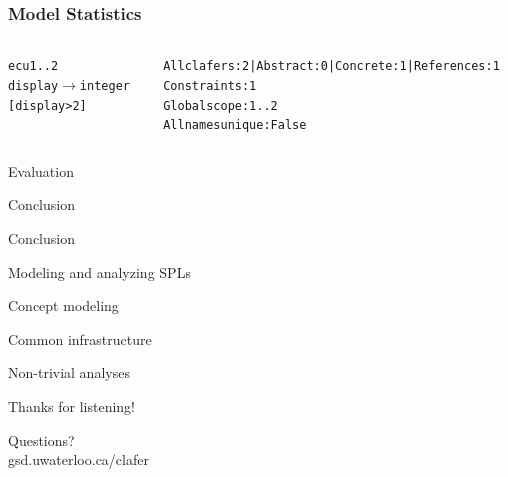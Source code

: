 \documentclass[table,15pt,t]{beamer}
\newcommand{\vmiddle}[1]{
  \vspace{\stretch{1}}
  #1
  \vspace{\stretch{1}}
}
\newcommand{\interframe}[1]{
\begin{frame}{}
\vmiddle{\hmiddle{\Huge #1}}
\end{frame}
}
\newcommand{\mlist}[1]{
\vmiddle{
  \begin{list}{}{}
    #1
  \end{list}
  }
}
\newcommand{\hmiddle}[1]{
  \begin{center}#1\end{center}
}
\newcounter{i}
\begin{document}
\begin{frame}[fragile]
  \frametitle{Model Statistics}
  \begin{columns}
    \begin{column}{0.5\textwidth}
      \begin{alltt}
        \begin{small}
\textsf{ecu} 1..2
  \textsf{display} $\rightarrow$ \textsf{integer}
  \textsf{[display > 2]}
        \end{small}
      \end{alltt}
    \end{column}
\pause
    \begin{column}{0.5\textwidth}
      \begin{alltt}
        \begin{small}
All clafers: 2 | Abstract: 0 | Concrete: 1 | References: 1
Constraints: 1
Global scope: 1..2
All names unique: False
        \end{small}
      \end{alltt}
    \end{column}
  \end{columns}

\end{frame}

\interframe{Evaluation}

\interframe{Conclusion}

\begin{frame}{Conclusion}
 \mlist{
    \item Modeling and analyzing SPLs\pause
    \item Concept modeling\pause
    \item Common infrastructure\pause
    \item Non-trivial analyses
 }
\end{frame}

\interframe{Thanks for listening!}

\interframe{Questions?\\[1cm]\normalsize{\textsf{gsd.uwaterloo.ca/clafer}}}
\end{document}
